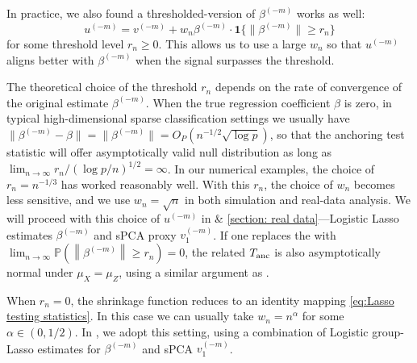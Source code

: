\documentclass[11pt]{article}
\begin{document}
In practice, we also found a thresholded-version of $\beta^{(-m)}$ works as well:
\begin{equation*}
u^{(-m)} = v^{(-m)} + w_n \beta^{(-m)} \cdot \mathbf{1}\{ \| \beta^{(-m)} \| \geq r_n \}
\end{equation*}
for some threshold level $r_n \geq 0$. This allows us to use a large $w_n$ so that $u^{(-m)}$ aligns better with $\beta^{(-m)}$ when the signal surpasses the threshold.
    
The theoretical choice of the threshold $r_n$ depends on the rate of convergence of the original estimate $\beta^{(-m)}$. When the true regression coefficient $\beta$ is zero, in typical high-dimensional sparse classification settings we usually have $\|\beta^{(-m)} - \beta\| = \|\beta^{(-m)}\| = O_P(n^{-1/2}\sqrt{\log p})$, so that the anchoring test statistic will offer asymptotically valid null distribution as long as $\lim_{n\rightarrow\infty} r_n/(\log p/n)^{1/2} = \infty$. 
In our numerical examples, the choice of $r_n = n^{-1/3}$ has worked reasonably well.  With this $r_n$, the choice of $w_n$ becomes less sensitive, and we use $w_n = \sqrt{n}$ in both simulation and real-data analysis. We will proceed with this choice of $u^{(-m)}$ in  \& \ref{section: real data}---Logistic Lasso estimates $\beta^{(-m)}$ and sPCA proxy $v_1^{(-m)}$. If one replaces the  with $\lim _{n \rightarrow \infty} \mathbb{P}\left(\left\|\beta^{(-m)}\right\| \geq r_n\right)=0$, the related $T_{\rm anc}$ is also asymptotically normal under $\mu_X = \mu_Z$, using a similar argument as . 

When $r_n = 0$, the shrinkage function reduces to an identity mapping \eqref{eq:Lasso testing statistics}. In this case we can usually take $w_n = n^{\alpha}$ for some $\alpha\in (0,1/2)$. In , we adopt this setting, using a combination of Logistic group-Lasso estimates for $\beta^{(-m)}$ and sPCA $v_1^{(-m)}$.

\end{document}
